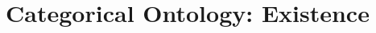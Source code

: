 \documentclass[a4paper]{../birkjour}
\title{Categorical Ontology: Existence}
\begin{document}

\maketitle

\tableofcontents
  
  
  
  
  
  
  \appendix
  
 
  {}
  
\end{document}
